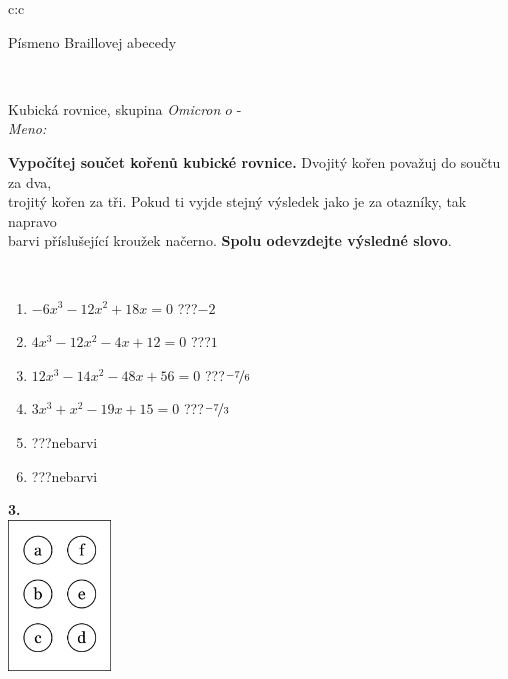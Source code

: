\documentclass[10pt]{report}
\newcommand\omicron{o}
\begin{document}
\begin{tabular}{c:c}
\begin{minipage}[c][104.5mm][t]{0.5\linewidth}
\begin{center}
\begin{minipage}{0.20\linewidth}
\begin{center}
{\small Písmeno Braillovej abecedy}
\end{center}
\end{minipage}
\end{center}
\end{minipage}
\\ \hdashline
\begin{minipage}[c][104.5mm][t]{0.5\linewidth}
\begin{center}
\vspace{7mm}
{\huge Kubická rovnice, skupina \textit{Omicron $\omicron$} -}\\[5mm]
\textit{Meno:}\phantom{xxxxxxxxxxxxxxxxxxxxxxxxxxxxxxxxxxxxxxxxxxxxxxxxxxxxxxxxxxxxxxxxx}\\[5mm]
\begin{minipage}{0.95\linewidth}
\textbf{Vypočítej součet kořenů kubické rovnice.} Dvojitý kořen považuj do součtu za dva,\\trojitý kořen za tři. Pokud ti vyjde stejný výsledek jako je za otazníky, tak napravo\\barvi příslušející kroužek načerno. \textbf{Spolu odevzdejte výsledné slovo}.
\end{minipage}
\\[1mm]
\begin{minipage}{0.79\linewidth}
\begin{center}
\begin{varwidth}{\linewidth}
\begin{enumerate}
\Large
\item $-6x^3-12x^2+18x=0$\quad \dotfill\; ???\;\dotfill \quad $-2$
\item $4x^3-12x^2-4x+12=0$\quad \dotfill\; ???\;\dotfill \quad $1$
\item $12x^3-14x^2-48x+56=0$\quad \dotfill\; ???\;\dotfill \quad $\nicefrac{-7}{6}$
\item $3x^3+x^2-19x+15=0$\quad \dotfill\; ???\;\dotfill \quad $\nicefrac{-7}{3}$
\item \quad \dotfill\; ???\;\dotfill \quad nebarvi
\item \quad \dotfill\; ???\;\dotfill \quad nebarvi
\end{enumerate}
\end{varwidth}
\end{center}
\end{minipage}
\begin{minipage}{0.20\linewidth}
\begin{center}
{\Huge\bfseries 3.} \\[2mm]
\includegraphics[height=40mm]{../images/braille.png}

\end{center}
\end{minipage}
\end{center}
\end{minipage}
\end{tabular}
\end{document}

